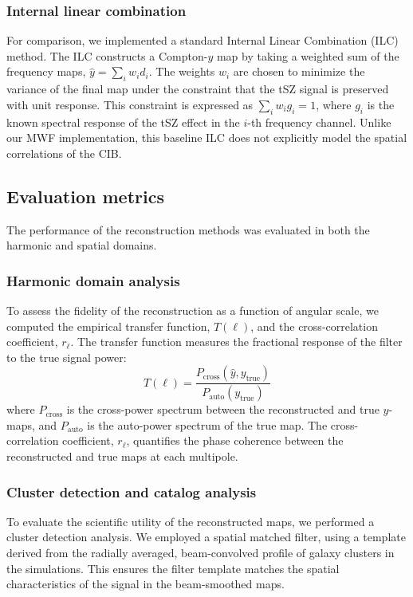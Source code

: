 \documentclass[]{article}
\begin{document}
\subsubsection{Internal linear combination}
For comparison, we implemented a standard Internal Linear Combination (ILC) method. The ILC constructs a Compton-$y$ map by taking a weighted sum of the frequency maps, $\hat{y} = \sum_i w_i d_i$. The weights $w_i$ are chosen to minimize the variance of the final map under the constraint that the tSZ signal is preserved with unit response. This constraint is expressed as $\sum_i w_i g_i = 1$, where $g_i$ is the known spectral response of the tSZ effect in the $i$-th frequency channel. Unlike our MWF implementation, this baseline ILC does not explicitly model the spatial correlations of the CIB.

\subsection{Evaluation metrics}
The performance of the reconstruction methods was evaluated in both the harmonic and spatial domains.

\subsubsection{Harmonic domain analysis}
To assess the fidelity of the reconstruction as a function of angular scale, we computed the empirical transfer function, $T(\ell)$, and the cross-correlation coefficient, $r_\ell$. The transfer function measures the fractional response of the filter to the true signal power:
\begin{equation}
    T(\ell) = \frac{P_{\text{cross}}(\hat{y}, y_{\text{true}})}{P_{\text{auto}}(y_{\text{true}})}
\end{equation}
where $P_{\text{cross}}$ is the cross-power spectrum between the reconstructed and true $y$-maps, and $P_{\text{auto}}$ is the auto-power spectrum of the true map. The cross-correlation coefficient, $r_\ell$, quantifies the phase coherence between the reconstructed and true maps at each multipole.

\subsubsection{Cluster detection and catalog analysis}
To evaluate the scientific utility of the reconstructed maps, we performed a cluster detection analysis. We employed a spatial matched filter, using a template derived from the radially averaged, beam-convolved profile of galaxy clusters in the simulations. This ensures the filter template matches the spatial characteristics of the signal in the beam-smoothed maps.
\end{document}
